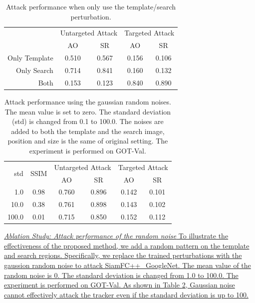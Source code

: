 \documentclass[journal]{IEEEtran}
\begin{document}
\begin{table}[t]
  \centering
  \caption{Attack performance when only use the template/search perturbation.}
  \label{table:one_branch}
  \begin{tabular}{@{}rcccc@{}}
  \toprule
                & \multicolumn{2}{c}{Untargeted Attack} & \multicolumn{2}{c}{Targeted Attack} \\ \cmidrule{2-5}
                & AO                & SR                & AO               & SR               \\ \midrule
  Only Template & 0.510             & 0.567             & 0.156            & 0.106            \\
  Only Search   & 0.714             & 0.841             & 0.160            & 0.132            \\
  Both          & 0.153             & 0.123             & 0.840            & 0.890            \\
  \bottomrule
  \end{tabular}
\end{table}

\begin{table}[t]
  \centering
  \caption{Attack performance using the gaussian random noises. The mean value is set to zero. The standard deviation (std) is changed from 0.1 to 100.0. The noises are added to both the template and the search image, position and size is the same of original setting. The experiment is performed on GOT-Val.}
  \begin{tabular}{@{}rccccc@{}}
  \toprule
  \multirow{2}{*}[-2pt]{std} & \multirow{2}{*}[-2pt]{SSIM}& \multicolumn{2}{c}{Untargeted Attack} & \multicolumn{2}{c}{Targeted Attack} \\ \cmidrule{3-6}
                             &                            & AO                & SR                & AO               & SR               \\ \midrule
  1.0                        & 0.98                       & 0.760             & 0.896             & 0.142            & 0.101            \\
  10.0                       & 0.38                       & 0.761             & 0.898             & 0.143            & 0.102            \\
  100.0                      & 0.01                       & 0.715             & 0.850             & 0.152            & 0.112            \\ \bottomrule        
  \end{tabular}
  \label{table:noise}
\end{table}
\uline{\textit{Ablation Study: Attack performance of the random noise} To illustrate the effectiveness of the proposed method, we add a random pattern on the template and search regions. 
Specifically, we replace the trained perturbations with the gaussion random noise to attack SiamFC++\_GoogleNet. The mean value of the random noise is 0. The standard deviation is changed from 1.0 to 100.0. The experiment is performed on GOT-Val.
As shown in Table \ref{table:noise}, Gaussian noise cannot effectively attack the tracker even if the standard deviation is up to 100.
}
\end{document}

